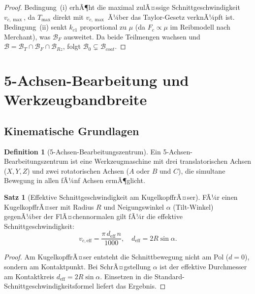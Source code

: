 ﻿\documentclass[a4paper,12pt]{article}
\theoremstyle{definition}
\newtheorem{definition}{Definition}
\newtheorem{satz}{Satz}
\begin{document}
\begin{proof}
  Bedingung~(i) erhÃ¶ht die maximal zulÃ¤ssige Schnittgeschwindigkeit $v_{c,\max}$,
  da $T_{\max}$ direkt mit $v_{c,\max}$ Ã¼ber das Taylor-Gesetz verknÃ¼pft ist.
  Bedingung~(ii) senkt $k_{c1}$ proportional zu $\mu$ (da $F_c \propto \mu$ im
  Reibmodell nach Merchant), was $\mathcal{B}_F$ ausweitet. Da beide Teilmengen
  wachsen und $\mathcal{B} = \mathcal{B}_T \cap \mathcal{B}_F \cap \mathcal{B}_{Rz}$,
  folgt $\mathcal{B}_0 \subsetneq \mathcal{B}_{coat}$. \qedhere
\end{proof}

\section{5-Achsen-Bearbeitung und Werkzeugbandbreite}
\label{sec:5achsen}

\subsection{Kinematische Grundlagen}

\begin{definition}[5-Achsen-Bearbeitungszentrum]
  Ein 5-Achsen-Bearbeitungszentrum ist eine Werkzeugmaschine mit drei translatorischen
  Achsen ($X, Y, Z$) und zwei rotatorischen Achsen ($A$ oder $B$ und $C$), die
  simultane Bewegung in allen fÃ¼nf Achsen ermÃ¶glicht.
\end{definition}

\begin{satz}[Effektive Schnittgeschwindigkeit am KugelkopffrÃ¤ser]
\label{satz:5achsen}
  FÃ¼r einen KugelkopffrÃ¤ser mit Radius $R$ und Neigungswinkel $\alpha$ (Tilt-Winkel)
  gegenÃ¼ber der FlÃ¤chennormalen gilt fÃ¼r die effektive Schnittgeschwindigkeit:
  \[
    v_{c,\text{eff}} = \frac{\pi \, d_{\text{eff}} \, n}{1000}, \quad
    d_{\text{eff}} = 2R\sin\alpha.
  \]
\end{satz}

\begin{proof}
  Am KugelkopffrÃ¤ser entsteht die Schnittbewegung nicht am Pol ($d = 0$), sondern
  am Kontaktpunkt. Bei SchrÃ¤gstellung $\alpha$ ist der effektive Durchmesser am
  Kontaktkreis $d_{\text{eff}} = 2R\sin\alpha$. Einsetzen in die
  Standard-Schnittgeschwindigkeitsformel liefert das Ergebnis. \qedhere
\end{proof}
\end{document}
